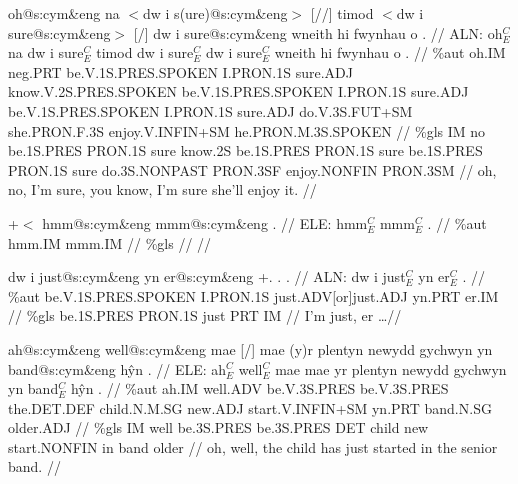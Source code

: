 \documentclass[a4paper,10pt]{article}
\begin{document}
\ex
\begingl[lingstyle=gergl]
\glchat oh@s:cym\&eng na $<$dw i s(ure)@s:cym\&eng$>$ [//] timod $<$dw i sure@s:cym\&eng$>$ [/] dw i sure@s:cym\&eng wneith hi fwynhau o . //
\glsurface ALN:  oh$^{C}_{E}$ na dw i sure$^{C}_{E}$ timod dw i sure$^{C}_{E}$ dw i sure$^{C}_{E}$ wneith hi fwynhau o .  //
\glauto \%aut  oh{\scriptsize .IM} neg{\scriptsize .PRT} be{\scriptsize .V.1S.PRES.SPOKEN} I{\scriptsize .PRON.1S} sure{\scriptsize .ADJ} know{\scriptsize .V.2S.PRES.SPOKEN} be{\scriptsize .V.1S.PRES.SPOKEN} I{\scriptsize .PRON.1S} sure{\scriptsize .ADJ} be{\scriptsize .V.1S.PRES.SPOKEN} I{\scriptsize .PRON.1S} sure{\scriptsize .ADJ} do{\scriptsize .V.3S.FUT+SM} she{\scriptsize .PRON.F.3S} enjoy{\scriptsize .V.INFIN+SM} he{\scriptsize .PRON.M.3S.SPOKEN}   //
\glmanual \%gls  IM no be{\scriptsize .1S.PRES} PRON{\scriptsize .1S} sure know{\scriptsize .2S} be{\scriptsize .1S.PRES} PRON{\scriptsize .1S} sure be{\scriptsize .1S.PRES} PRON{\scriptsize .1S} sure do{\scriptsize .3S.NONPAST} PRON{\scriptsize .3SF} enjoy{\scriptsize .NONFIN} PRON{\scriptsize .3SM}   //
\gleng oh, no, I'm sure, you know, I'm sure she'll enjoy it. //
\endgl
\xe

\ex
\begingl[lingstyle=gergl]
\glchat +$<$ hmm@s:cym\&eng mmm@s:cym\&eng . //
\glsurface ELE:  hmm$^{C}_{E}$ mmm$^{C}_{E}$ .  //
\glauto \%aut  hmm{\scriptsize .IM} mmm{\scriptsize .IM}   //
\glmanual \%gls      //
\gleng  //
\endgl
\xe

\ex
\begingl[lingstyle=gergl]
\glchat dw i just@s:cym\&eng yn er@s:cym\&eng +. . . //
\glsurface ALN:  dw i just$^{C}_{E}$ yn er$^{C}_{E}$ .  //
\glauto \%aut  be{\scriptsize .V.1S.PRES.SPOKEN} I{\scriptsize .PRON.1S} just{\scriptsize .ADV[or]just.ADJ} yn{\scriptsize .PRT} er{\scriptsize .IM}   //
\glmanual \%gls  be{\scriptsize .1S.PRES} PRON{\scriptsize .1S} just PRT IM   //
\gleng I'm just, er \dots  //
\endgl
\xe

\ex
\begingl[lingstyle=gergl]
\glchat ah@s:cym\&eng well@s:cym\&eng mae [/] mae (y)r plentyn newydd gychwyn yn band@s:cym\&eng hŷn . //
\glsurface ELE:  ah$^{C}_{E}$ well$^{C}_{E}$ mae mae yr plentyn newydd gychwyn yn band$^{C}_{E}$ hŷn .  //
\glauto \%aut  ah{\scriptsize .IM} well{\scriptsize .ADV} be{\scriptsize .V.3S.PRES} be{\scriptsize .V.3S.PRES} the{\scriptsize .DET.DEF} child{\scriptsize .N.M.SG} new{\scriptsize .ADJ} start{\scriptsize .V.INFIN+SM} yn{\scriptsize .PRT} band{\scriptsize .N.SG} older{\scriptsize .ADJ}   //
\glmanual \%gls  IM well be{\scriptsize .3S.PRES} be{\scriptsize .3S.PRES} DET child new start{\scriptsize .NONFIN} in band older   //
\gleng oh, well, the child has just started in the senior band. //
\endgl
\xe
\end{document}
